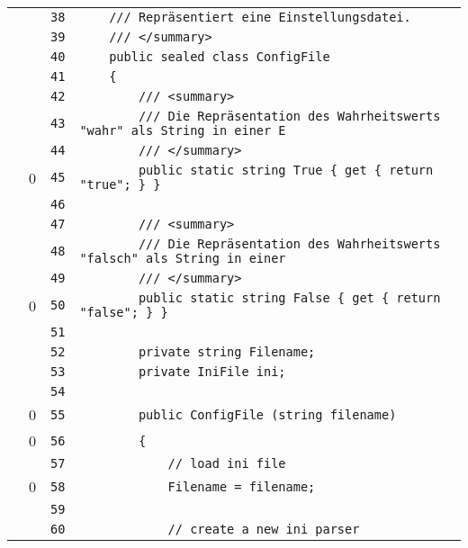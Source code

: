 \documentclass[a4paper,10pt]{article}
\begin{document}
\begin{longtable}[l]{lrrl}
\cellcolor{gray} &  & \verb~38~ & \verb~    /// Repräsentiert eine Einstellungsdatei.~\\
\cellcolor{gray} &  & \verb~39~ & \verb~    /// </summary>~\\
\cellcolor{gray} &  & \verb~40~ & \verb~    public sealed class ConfigFile~\\
\cellcolor{gray} &  & \verb~41~ & \verb~    {~\\
\cellcolor{gray} &  & \verb~42~ & \verb~        /// <summary>~\\
\cellcolor{gray} &  & \verb~43~ & \verb~        /// Die Repräsentation des Wahrheitswerts "wahr" als String in einer E~\\
\cellcolor{gray} &  & \verb~44~ & \verb~        /// </summary>~\\
\cellcolor{red} & 0 & \verb~45~ & \verb~        public static string True { get { return "true"; } }~\\
\cellcolor{gray} &  & \verb~46~ & \verb~~\\
\cellcolor{gray} &  & \verb~47~ & \verb~        /// <summary>~\\
\cellcolor{gray} &  & \verb~48~ & \verb~        /// Die Repräsentation des Wahrheitswerts "falsch" als String in einer~\\
\cellcolor{gray} &  & \verb~49~ & \verb~        /// </summary>~\\
\cellcolor{red} & 0 & \verb~50~ & \verb~        public static string False { get { return "false"; } }~\\
\cellcolor{gray} &  & \verb~51~ & \verb~~\\
\cellcolor{gray} &  & \verb~52~ & \verb~        private string Filename;~\\
\cellcolor{gray} &  & \verb~53~ & \verb~        private IniFile ini;~\\
\cellcolor{gray} &  & \verb~54~ & \verb~~\\
\cellcolor{red} & 0 & \verb~55~ & \verb~        public ConfigFile (string filename)~\\
\cellcolor{red} & 0 & \verb~56~ & \verb~        {~\\
\cellcolor{gray} &  & \verb~57~ & \verb~            // load ini file~\\
\cellcolor{red} & 0 & \verb~58~ & \verb~            Filename = filename;~\\
\cellcolor{gray} &  & \verb~59~ & \verb~~\\
\cellcolor{gray} &  & \verb~60~ & \verb~            // create a new ini parser~\\

\end{longtable}
\end{document}
